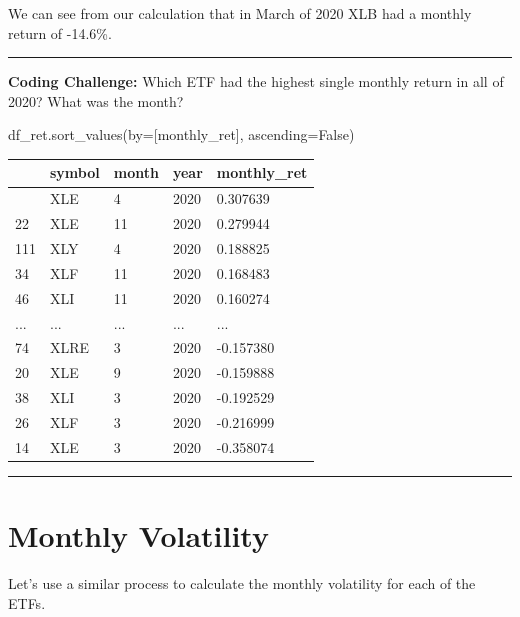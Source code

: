 \documentclass[
  letterpaper,
  DIV=11,
  numbers=noendperiod]{scrreprt}
\newenvironment{Shaded}{\begin{snugshade}}{\end{snugshade}}
\newcommand{\NormalTok}[1]{\textcolor[rgb]{0.00,0.23,0.31}{#1}}
\newcommand{\OperatorTok}[1]{\textcolor[rgb]{0.37,0.37,0.37}{#1}}
\newcommand{\StringTok}[1]{\textcolor[rgb]{0.13,0.47,0.30}{#1}}
\newcommand{\VariableTok}[1]{\textcolor[rgb]{0.07,0.07,0.07}{#1}}
\begin{document}
We can see from our calculation that in March of 2020 XLB had a monthly
return of -14.6\%.

\begin{center}\rule{0.5\linewidth}{0.5pt}\end{center}

\textbf{Coding Challenge:} Which ETF had the highest single monthly
return in all of 2020? What was the month?

\begin{Shaded}
\begin{Highlighting}[]
\NormalTok{df\_ret.sort\_values(by}\OperatorTok{=}\NormalTok{[}\StringTok{\textquotesingle{}monthly\_ret\textquotesingle{}}\NormalTok{], ascending}\OperatorTok{=}\VariableTok{False}\NormalTok{)}
\end{Highlighting}
\end{Shaded}

\begin{longtable}[]{@{}lllll@{}}
\toprule\noalign{}
& symbol & month & year & monthly\_ret \\
\midrule\noalign{}
\endhead
\bottomrule\noalign{}
\endlastfoot
15 & XLE & 4 & 2020 & 0.307639 \\
22 & XLE & 11 & 2020 & 0.279944 \\
111 & XLY & 4 & 2020 & 0.188825 \\
34 & XLF & 11 & 2020 & 0.168483 \\
46 & XLI & 11 & 2020 & 0.160274 \\
... & ... & ... & ... & ... \\
74 & XLRE & 3 & 2020 & -0.157380 \\
20 & XLE & 9 & 2020 & -0.159888 \\
38 & XLI & 3 & 2020 & -0.192529 \\
26 & XLF & 3 & 2020 & -0.216999 \\
14 & XLE & 3 & 2020 & -0.358074 \\
\end{longtable}

\begin{center}\rule{0.5\linewidth}{0.5pt}\end{center}

\hypertarget{monthly-volatility}{%
\section{Monthly Volatility}\label{monthly-volatility}}

Let's use a similar process to calculate the monthly volatility for each
of the ETFs.
\end{document}
